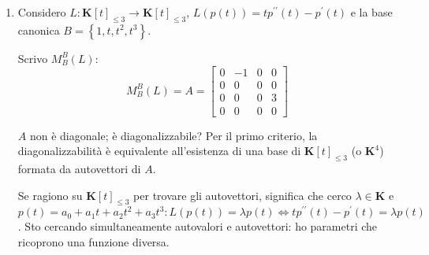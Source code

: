 \documentclass{article}
\begin{document}
\begin{enumerate}
\item Considero $L:\mathbf{K}\left[ t\right] _{\leq 3}\rightarrow \mathbf{K}%
\left[ t\right] _{\leq 3}$, $L\left( p\left( t\right) \right) =tp^{\prime
\prime }\left( t\right) -p^{\prime }\left( t\right) $ e la base canonica $%
B=\left\{ 1,t,t^{2},t^{3}\right\} $.

Scrivo $M_{B}^{B}\left( L\right) $:%
\begin{equation*}
M_{B}^{B}\left( L\right) =A=\left[ 
\begin{array}{cccc}
0 & -1 & 0 & 0 \\ 
0 & 0 & 0 & 0 \\ 
0 & 0 & 0 & 3 \\ 
0 & 0 & 0 & 0%
\end{array}%
\right]
\end{equation*}

$A$ non \`{e} diagonale; \`{e} diagonalizzabile? Per il primo criterio, la
diagonalizzabilit\`{a} \`{e} equivalente all'esistenza di una base di $%
\mathbf{K}\left[ t\right] _{\leq 3}$ (o $\mathbf{K}^{4}$) formata da
autovettori di $A$.

Se ragiono su $\mathbf{K}\left[ t\right] _{\leq 3}$ per trovare gli
autovettori, significa che cerco $\lambda \in \mathbf{K}$ e $p\left(
t\right) =a_{0}+a_{1}t+a_{2}t^{2}+a_{3}t^{3}:L\left( p\left( t\right)
\right) =\lambda p\left( t\right) \Longleftrightarrow tp^{\prime \prime
}\left( t\right) -p^{\prime }\left( t\right) =\lambda p\left( t\right) $.
Sto cercando simultaneamente autovalori e autovettori: ho parametri che
ricoprono una funzione diversa.


\end{enumerate}
\end{document}
